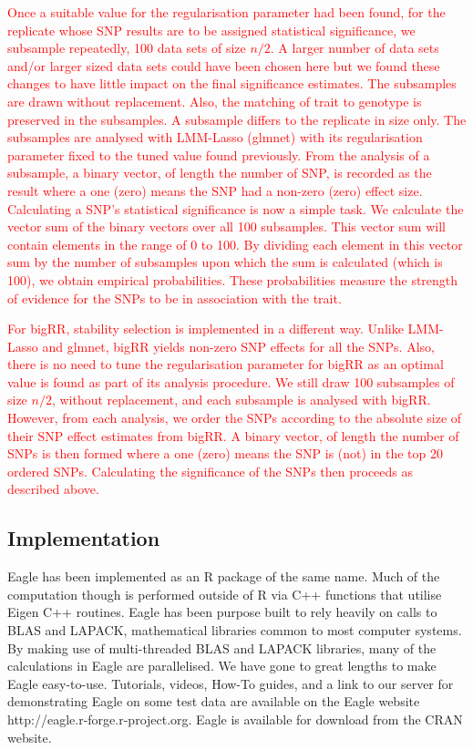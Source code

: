 \documentclass{bioinfo}
\begin{document}
 \textcolor{red}{
 Once a suitable value for the regularisation parameter had been found, for the replicate  whose 
 SNP results are to be assigned statistical significance, we subsample repeatedly, 100 data sets of size $n/2$. A larger number of 
 data sets  and/or larger sized data sets could have been chosen here but we found these changes to have 
 little impact on the final significance estimates. The subsamples are drawn without replacement. Also, 
 the matching of trait to genotype is preserved in the subsamples. A subsample differs to the replicate in size only. 
 The subsamples are analysed with LMM-Lasso (glmnet) with its regularisation parameter fixed to the tuned value found previously. 
From the analysis of a subsample, a binary vector, of length the number of SNP, is recorded as the result where a one (zero) means the SNP had a non-zero (zero) effect size. 
Calculating a SNP's statistical significance is now a simple task. We calculate the vector sum of the binary vectors over all 100 subsamples. 
This vector sum will contain elements in the range of 0 to 100. By dividing each element in this vector sum by the number of 
subsamples upon which the sum is calculated (which is 100), we obtain empirical probabilities.  
 These 
probabilities measure the strength of evidence for the SNPs to be in association with the trait. 
}

\textcolor{red}{
For bigRR, stability selection is implemented in a different way. Unlike LMM-Lasso and glmnet, bigRR yields non-zero SNP effects 
for all the SNPs. Also, there is no need to tune the regularisation parameter for bigRR as an optimal value is found as part of its analysis 
procedure. We still draw 100 subsamples of size $n/2$, without replacement, and each subsample is analysed with bigRR. 
However, from each analysis, we order the SNPs according to the absolute size of their SNP effect estimates from bigRR. 
 A binary vector, of length the number of SNPs is then formed 
where a one (zero) means the SNP is (not) in the top 20 ordered SNPs.  Calculating the significance of the SNPs then proceeds as described 
above. 
}
 



\subsection{Implementation}

Eagle has been implemented as an R package of the same name. Much of the computation though is performed outside of R 
via C++ functions that utilise Eigen C++ routines. Eagle has been purpose built to rely heavily on calls to BLAS and LAPACK, 
mathematical libraries common to most computer systems. By making use of multi-threaded  BLAS and LAPACK libraries, many of the 
calculations in Eagle are parallelised. We have gone to great lengths to make Eagle easy-to-use. Tutorials, videos, How-To guides, and 
a link to our server for demonstrating Eagle on some test data are available on the Eagle website http://eagle.r-forge.r-project.org. Eagle is available for download from the CRAN website. 
\end{document}
